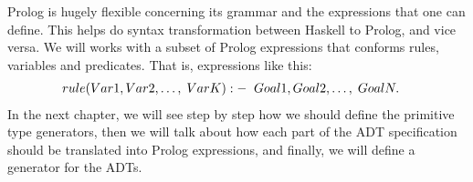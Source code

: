Prolog is hugely flexible concerning its grammar and the expressions that one can define. This helps do syntax transformation between Haskell to Prolog, and vice versa.
We will works with a subset of Prolog expressions that conforms rules, variables and predicates. That is, expressions like this:
\begin{align*}
	rule(Var1, Var2, \ldots, \; VarK) &:-\;\; Goal1, Goal2, \ldots, \; GoalN.
\end{align*}
In the next chapter, we will see step by step how we should define the primitive type generators, then we will talk about how each part of the ADT specification should be translated into Prolog expressions, and finally, we will define a generator for the ADTs.